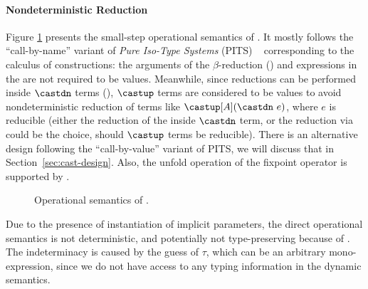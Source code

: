 \paragraph{Nondeterministic Reduction}
Figure \ref{fig:semantics} presents the small-step operational semantics of \name.
It mostly follows the ``call-by-name'' variant of \emph{Pure Iso-Type Systems} (PITS)
~\cite{yang2019pure} corresponding to the calculus of constructions:
the arguments of the $\beta$-reduction () and expressions in
the  are not required to be values.
Meanwhile, since reductions can be performed inside $\castdn$ terms (),
$\castup$ terms are considered to be values to avoid nondeterministic reduction of
terms like $\castup [A] (\castdn ~e)$, where $e$ is reducible
(either the reduction of the inside $\castdn$ term, or the reduction via
 could be the choice, should $\castup$ terms be reducible).
There is an alternative design following the ``call-by-value'' variant of PITS, we
will discuss that in Section~\ref{sec:cast-design}.
Also, the unfold operation of the fixpoint operator is supported by .

\begin{figure}[t]
    \centering


    \caption{Operational semantics of \name.}
    \label{fig:semantics}
\end{figure}

Due to the presence of instantiation of implicit parameters, the direct operational
semantics is not deterministic, and potentially not type-preserving because of
. The indeterminacy is caused by the guess of $\tau$,
which can be an arbitrary mono-expression, since we do not have access to any typing
information in the dynamic semantics.

